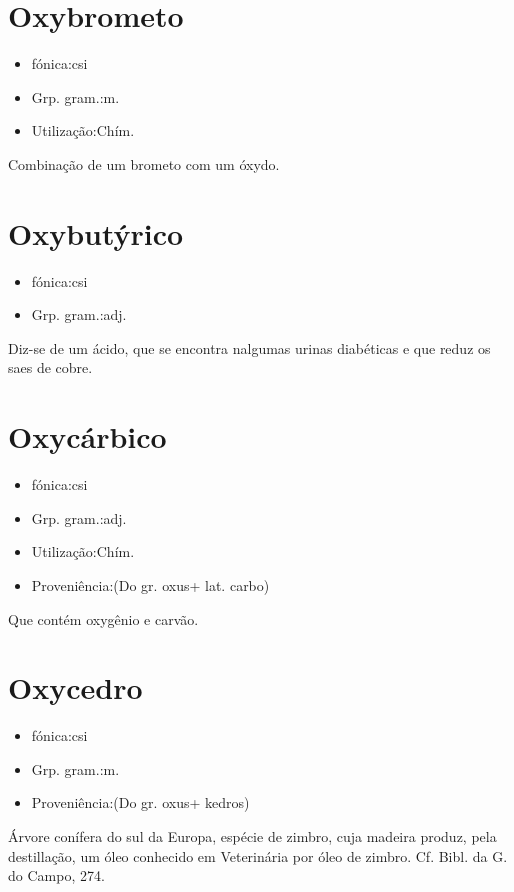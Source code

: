 \section{Oxybrometo}
\begin{itemize}
\item {fónica:csi}
\end{itemize}
\begin{itemize}
\item {Grp. gram.:m.}
\end{itemize}
\begin{itemize}
\item {Utilização:Chím.}
\end{itemize}
Combinação de um brometo com um óxydo.
\section{Oxybutýrico}
\begin{itemize}
\item {fónica:csi}
\end{itemize}
\begin{itemize}
\item {Grp. gram.:adj.}
\end{itemize}
Diz-se de um ácido, que se encontra nalgumas urinas diabéticas e que reduz os saes de cobre.
\section{Oxycárbico}
\begin{itemize}
\item {fónica:csi}
\end{itemize}
\begin{itemize}
\item {Grp. gram.:adj.}
\end{itemize}
\begin{itemize}
\item {Utilização:Chím.}
\end{itemize}
\begin{itemize}
\item {Proveniência:(Do gr. \textunderscore oxus\textunderscore  + lat. \textunderscore carbo\textunderscore )}
\end{itemize}
Que contém oxygênio e carvão.
\section{Oxycedro}
\begin{itemize}
\item {fónica:csi}
\end{itemize}
\begin{itemize}
\item {Grp. gram.:m.}
\end{itemize}
\begin{itemize}
\item {Proveniência:(Do gr. \textunderscore oxus\textunderscore  + \textunderscore kedros\textunderscore )}
\end{itemize}
Árvore conífera do sul da Europa, espécie de zimbro, cuja madeira produz, pela destillação, um óleo conhecido em Veterinária por \textunderscore óleo de zimbro\textunderscore . Cf. \textunderscore Bibl. da G. do Campo\textunderscore , 274.
